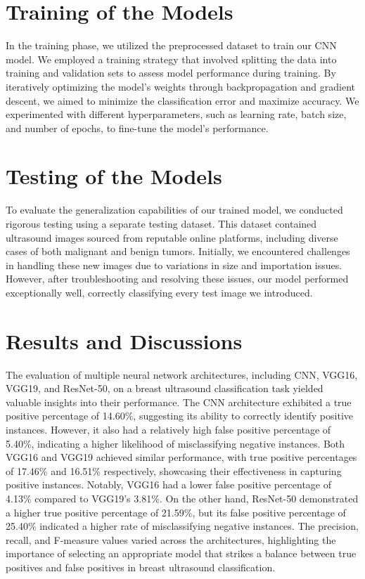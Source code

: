 \documentclass{article}
\begin{document}
\section{Training of the Models}
In the training phase, we utilized the preprocessed dataset to train our CNN model. We employed a training strategy that involved splitting the data into training and validation sets to assess model performance during training. By iteratively optimizing the model's weights through backpropagation and gradient descent, we aimed to minimize the classification error and maximize accuracy. We experimented with different hyperparameters, such as learning rate, batch size, and number of epochs, to fine-tune the model's performance. 

\section{Testing of the Models}
To evaluate the generalization capabilities of our trained model, we conducted rigorous testing using a separate testing dataset. This dataset contained ultrasound images sourced from reputable online platforms, including diverse cases of both malignant and benign tumors. Initially, we encountered challenges in handling these new images due to variations in size and importation issues. However, after troubleshooting and resolving these issues, our model performed exceptionally well, correctly classifying every test image we introduced.

\section{Results and Discussions}
The evaluation of multiple neural network architectures, including CNN, VGG16, VGG19, and ResNet-50, on a breast ultrasound classification task yielded valuable insights into their performance. The CNN architecture exhibited a true positive percentage of 14.60\%, suggesting its ability to correctly identify positive instances. However, it also had a relatively high false positive percentage of 5.40\%, indicating a higher likelihood of misclassifying negative instances. Both VGG16 and VGG19 achieved similar performance, with true positive percentages of 17.46\% and 16.51\% respectively, showcasing their effectiveness in capturing positive instances. Notably, VGG16 had a lower false positive percentage of 4.13\% compared to VGG19's 3.81\%. On the other hand, ResNet-50 demonstrated a higher true positive percentage of 21.59\%, but its false positive percentage of 25.40\% indicated a higher rate of misclassifying negative instances. The precision, recall, and F-measure values varied across the architectures, highlighting the importance of selecting an appropriate model that strikes a balance between true positives and false positives in breast ultrasound classification.
\end{document}
